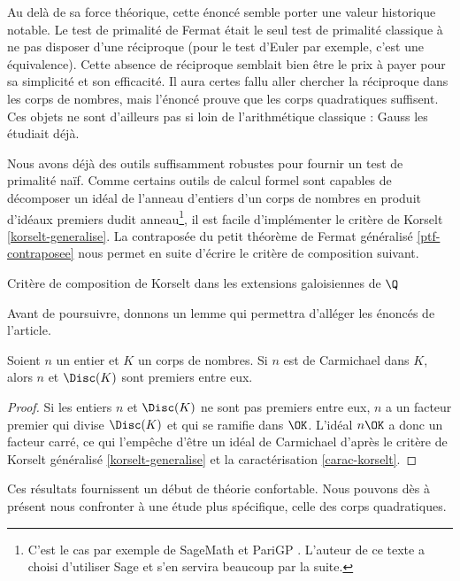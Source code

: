 \begin{remarque}
Au delà de sa force théorique, cette énoncé semble porter une valeur historique notable. Le test de primalité de Fermat était le seul test de primalité classique à ne pas disposer d'une réciproque (pour le test d'Euler par exemple, c'est une équivalence). Cette absence de réciproque semblait bien être le prix à payer pour sa simplicité et son efficacité. Il aura certes fallu aller chercher la réciproque dans les corps de nombres, mais l'énoncé prouve que les corps quadratiques suffisent. Ces objets ne sont d'ailleurs pas si loin de l'arithmétique classique : Gauss les étudiait déjà.
\end{remarque}

Nous avons déjà des outils suffisamment robustes pour fournir un test de primalité naïf. Comme certains outils de calcul formel sont capables de décomposer un idéal de l'anneau d'entiers d'un corps de nombres en produit d'idéaux premiers dudit anneau\footnote{C'est le cas par exemple de SageMath et PariGP . L'auteur de ce texte a choisi d'utiliser Sage et s'en servira beaucoup par la suite.}, il est facile d'implémenter le critère de Korselt \ref{korselt-generalise}. La contraposée du petit théorème de Fermat généralisé \ref{ptf-contraposee} nous permet en suite d'écrire le critère de composition suivant.

\vspace{1em}
\begin{algorithm}[H]\label{test-primalite-korselt}
\caption{Critère de composition de Korselt dans les extensions galoisiennes de $\Q$}
\end{algorithm}
\vspace{1em}

Avant de poursuivre, donnons un lemme qui permettra d'alléger les énoncés de l'article.

\begin{lemme}
	Soient $n$ un entier et $K$ un corps de nombres. Si $n$ est de Carmichael dans $K$, alors $n$ et $\Disc(K)$ sont premiers entre eux.
\end{lemme}

\begin{proof}
	Si les entiers $n$ et $\Disc(K)$ ne sont pas premiers entre eux, $n$ a un facteur premier qui divise $\Disc(K)$ et qui se ramifie dans $\OK$. L'idéal $n\OK$ a donc un facteur carré, ce qui l'empêche d'être un idéal de Carmichael d'après le critère de Korselt généralisé \ref{korselt-generalise} et la caractérisation \ref{carac-korselt}.
\end{proof}

Ces résultats fournissent un début de théorie confortable. Nous pouvons dès à présent nous confronter à une étude plus spécifique, celle des corps quadratiques.
